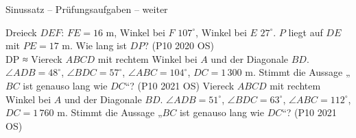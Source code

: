 \begin{aufgabe}{Sinussatz – Prüfungsaufgaben – weiter}
\begin{teile}
\steil Dreieck $DEF$: $FE = 16$ m, Winkel bei $F$ $107^\circ$, Winkel bei $E$ $27^\circ$. $P$ liegt auf $DE$ mit $PE = 17$ m. Wie lang ist $DP$? \hfill (P10 2020 OS) \\ DP ≈ \leerfeld[m]
\steil Viereck $ABCD$ mit rechtem Winkel bei $A$ und der Diagonale $BD$. $\angle ADB = 48^\circ$, $\angle BDC = 57^\circ$, $\angle ABC = 104^\circ$, $DC = 1\,300$ m. Stimmt die Aussage „$BC$ ist genauso lang wie $DC$“? \hfill (P10 2021 OS)
\steil Viereck $ABCD$ mit rechtem Winkel bei $A$ und der Diagonale $BD$. $\angle ADB = 51^\circ$, $\angle BDC = 63^\circ$, $\angle ABC = 112^\circ$, $DC = 1\,760$ m. Stimmt die Aussage „$BC$ ist genauso lang wie $DC$“? \hfill (P10 2021 OS)
\end{teile}
\end{aufgabe}
